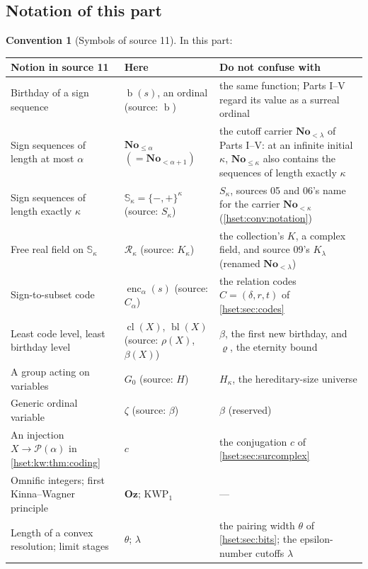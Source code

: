 \documentclass[11pt,letterpaper]{article}
\theoremstyle{definition}
\newtheorem{convention}[convention]{Convention}\aliascntresetthe{convention}
\theoremstyle{remark}
\newcommand{\No}{\mathbf{No}}
\newcommand{\bd}{\operatorname{b}}
\newcommand{\Pow}{\mathcal P}
\newcommand{\KWP}{\mathrm{KWP}}
\newcommand{\Oz}{\mathbf{Oz}}
\begin{document}
\subsection{Notation of this part}
\label{hset:kw:sub:notation}

\begin{convention}[Symbols of source 11]\label{hset:kw:conv:notation}
In this part:
\begin{center}\small
\begin{longtable}{@{}P{0.25\textwidth}P{0.22\textwidth}P{0.45\textwidth}@{}}
\toprule
Notion in source 11 & Here & Do not confuse with\\
\midrule\endhead
Birthday of a sign sequence & $\bd(s)$, an ordinal (source: $\operatorname{b}$) & the same function; Parts I--V regard its value as a surreal ordinal\\
Sign sequences of length at most $\alpha$ & $\No_{\le\alpha}$ $(=\No_{<\alpha+1})$ & the cutoff carrier $\No_{<\lambda}$ of Parts I--V: at an infinite initial $\kappa$, $\No_{\le\kappa}$ also contains the sequences of length exactly $\kappa$\\
Sign sequences of length exactly $\kappa$ & $\mathbb S_\kappa=\{-,+\}^\kappa$ (source: $S_\kappa$) & $S_\kappa$, sources 05 and 06's name for the carrier $\No_{<\kappa}$ (\cref{hset:conv:notation})\\
Free real field on $\mathbb S_\kappa$ & $\mathcal R_\kappa$ (source: $K_\kappa$) & the collection's $K$, a complex field, and source 09's $K_\lambda$ (renamed $\No_{<\lambda}$)\\
Sign-to-subset code & $\operatorname{enc}_\alpha(s)$ (source: $C_\alpha$) & the relation codes $C=(\delta,r,t)$ of \cref{hset:sec:codes}\\
Least code level, least birthday level & $\operatorname{cl}(X)$, $\operatorname{bl}(X)$ (source: $\rho(X)$, $\beta(X)$) & $\beta$, the first new birthday, and $\varrho$, the eternity bound\\
A group acting on variables & $G_0$ (source: $H$) & $H_\kappa$, the hereditary-size universe\\
Generic ordinal variable & $\zeta$ (source: $\beta$) & $\beta$ (reserved)\\
An injection $X\to\Pow(\alpha)$ in \cref{hset:kw:thm:coding} & $c$ & the conjugation $c$ of \cref{hset:sec:surcomplex}\\
Omnific integers; first Kinna--Wagner principle & $\Oz$; $\KWP_1$ & ---\\
Length of a convex resolution; limit stages & $\theta$; $\lambda$ & the pairing width $\theta$ of \cref{hset:sec:bits}; the epsilon-number cutoffs $\lambda$\\

\end{longtable}
\end{center}
\end{convention}
\end{document}

